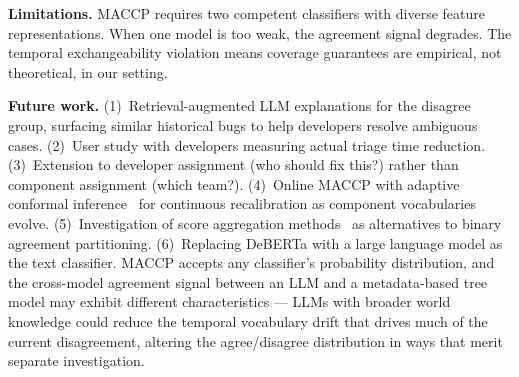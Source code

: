 \documentclass[conference]{IEEEtran}
\begin{document}
\textbf{Limitations.} MACCP requires two competent classifiers with diverse feature representations. When one model is too weak, the agreement signal degrades. The temporal exchangeability violation means coverage guarantees are empirical, not theoretical, in our setting.

\textbf{Future work.}
(1)~Retrieval-augmented LLM explanations for the disagree group, surfacing similar historical bugs to help developers resolve ambiguous cases.
(2)~User study with developers measuring actual triage time reduction.
(3)~Extension to developer assignment (who should fix this?) rather than component assignment (which team?).
(4)~Online MACCP with adaptive conformal inference~\cite{gibbs2021adaptive} for continuous recalibration as component vocabularies evolve.
(5)~Investigation of score aggregation methods~\cite{alami2025sacp,ochoarivera2025csa} as alternatives to binary agreement partitioning.
(6)~Replacing DeBERTa with a large language model as the text classifier. MACCP accepts any classifier's probability distribution, and the cross-model agreement signal between an LLM and a metadata-based tree model may exhibit different characteristics --- LLMs with broader world knowledge could reduce the temporal vocabulary drift that drives much of the current disagreement, altering the agree/disagree distribution in ways that merit separate investigation.

\balance



\end{document}

